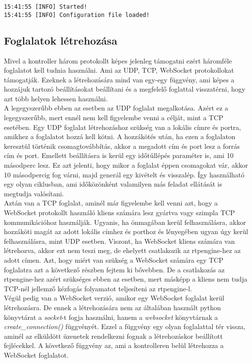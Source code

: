\begin{lstlisting}[caption=Naplózás formátuma, label=lst:logging]
15:41:55 [INFO] Started!
15:41:55 [INFO] Configuration file loaded!
\end{lstlisting}

\subsection{Foglalatok létrehozása}

Mivel a kontroller három protokollt képes jelenleg támogatni ezért háromféle foglalatot 
kell tudnia használni. Ami az UDP, TCP, WebSocket protokollokat támogatják. Ezeknek a
létrehozására mind van egy-egy függvény, ami képes a hozzájuk tartozó beállításokat 
beállítani és a megfelelő foglattal visszatérni, hogy azt több helyen lehessen használni. \\

A legegyszerűbb ebben az esetben az UDP foglalat megalkotása. Azért ez a legegyszerűbb,
mert ennél nem kell figyelembe venni a célját, mint a TCP esetében. Egy UDP foglalat 
létrehozáshoz szükség van a lokális címre és portra, amikhez a foglalatot hozzá kell 
kötni. A hozzákötés után, ha ezen a foglalaton keresztül történik csomagtovábbítás, 
akkor a megadott cím és port lesz a forrás cím és port. Emellett beállításra is
kerül egy időtúllépés paraméter is, ami 10 másodperc lesz. Ez azt jelenti, hogy
mikor a foglalat éppen csomagokat vár, akkor 10 másodpercig fog várni, majd generál 
egy kivételt és visszalép. Így használható egy olyan ciklusban, ami időközönként
valamilyen más feladat ellátását is megtudja valósítani. \\

Aztán van a TCP foglalat, aminél már figyelembe kell venni azt, hogy a WebSocket
protokollt használó kliens számára lesz gyártva vagy szimpla TCP kommunikációhoz 
használják. Ugyanis, ha önmagában kerül felhasználásra, akkor hozzáköti magát
az adott lokális címhez és porthoz és lényegében ugyan úgy kerül felhasználásra,
mint UDP esetben. Viszont, ha WebSocket kliens számára van létrehozva, akkor ezt
nem teszi meg, de ehelyett csatlakozik az rtpengine-hez az adott címen. Azt, hogy
miért van szükség a WebSocket számára egy TCP foglalatra azt a következő részben 
fejtem ki bővebben. De a csatlakozás az rtpengine-hez azért szükséges ebben az
esetben, mert másképp a kliens nem tudja TCP-nél jellemző kézfogás folyamatot
teljesíteni az rtpengine-l. \\

Végül pedig van a WebSocket verzió, amikor egy WebSocket foglalat kerül létrehozásra.
De ennek a létrehozására nem az általában használt python könyvtárat a \textit{socket}-t
fogja használni, hanem a \textit{websocket} könyvtárnak a \textit{create\_connection()}
függvényét. Ezzel a függvény egy olyan foglalattal tér vissza, aminél az elküldött 
üzenetek rendelkezni fognak a létrehozáskor beállított fejlécekkel. A következő 
függvény az, ami a kontrolleren belül létrehozza a WebSocket foglalatot. 

